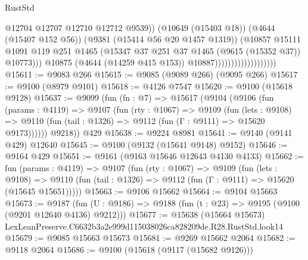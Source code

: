 \begin{lexlean}{RustStd}
\begin{coremodule}
                                                @12704
                                                @12707
                                                @12710
                                                @12712
                                                @9539))
                                            (@10649 (@15403 @18))
                                            (@4644 (@15407 @152 @56))
                                            (@9381 (@15414 @56 @20 @1457 @1319))
                                            (@10857
                                              @15111
                                              @1091
                                              @119
                                              @251
                                              @1465
                                              (@15347
                                                @37
                                                @251
                                                @37
                                                @1465
                                                (@9615 (@15352 @37))
                                                @10773)))
                                          @10875
                                          (@4644 (@14259 @415 @153))
                                          @10887)))))))))))))))))))
@15611 := @9083 @266
@15615 := @9085 (@9089 @266) (@9095 @266)
@15617 := @9100 (@8979 @9101)
@15618 := @4126 @7547
@15620 := @9100 (@15618 @9128)
@15637 := @9099
    (fun (fn : @7) =>
    @15617
      (@9104
        (@9106
          (fun (params : @4119) =>
          @9107
            (fun (rty : @1067) =>
            @9109
              (fun (lets : @9108) =>
              @9110 (fun (tail : @1326) => @9112 (fun (Γ : @9111) => @15620 @9173))))))
        @9218))
    @429
@15638 := @9224 @8981
@15641 := @9140 (@9141 @429) @12640
@15645 := @9100 (@9132 (@15641 @9148) @9152)
@15646 := @9164 @429
@15651 := @9161 (@9163 @15646 @12643 @4130 @4133)
@15662 := fun (params : @4119) =>
  @9107
    (fun (rty : @1067) =>
    @9109
      (fun (lets : @9108) =>
      @9110 (fun (tail : @1326) => @9112 (fun (Γ : @9111) => @15620 (@15645 @15651)))))
@15663 := @9106 @15662
@15664 := @9104 @15663
@15673 := @9187
    (fun (U : @9186) => @9188 (fun (t : @23) => @9195 (@9100 (@9201 @12640 @4136) @9212)))
@15677 := @15638
    (@15664 @15673)
    LexLeanPreserve.C6632b3a2e999d115038026ca828209de.R28.RustStd.look14
@15679 := @9085 @15663 @15673
@15681 := @9269 @15662 @2064
@15682 := @9118 @2064
@15686 := @9100 (@15618 (@9117 (@15682 @9126)))

\end{coremodule}
\end{lexlean}
